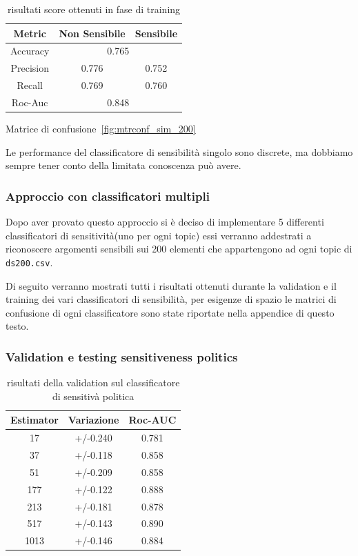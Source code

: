 \begin{table}[h]
\label{tbl:training_sens}
\centering
\begin{tabular}{|c|c|c|}
\hline
\textbf{Metric} & \textbf{Non Sensibile} & \textbf{Sensibile} \\ \hline
Accuracy & \multicolumn{2}{c|}{0.765} \\ \hline
Precision & 0.776 & 0.752 \\ \hline
Recall & 0.769 & 0.760 \\ \hline
Roc-Auc & \multicolumn{2}{c|}{0.848} \\ \hline
\end{tabular}
\caption{risultati score ottenuti in  fase di training}
\end{table}
\FloatBarrier

Matrice di confusione~\ref{fig:mtrconf_sim_200}\newline

Le performance del classificatore di sensibilità singolo sono discrete, ma dobbiamo sempre tener conto della limitata conoscenza può avere.

\subsubsection{Approccio con classificatori multipli}
\label{sssec:multiclass}
Dopo aver provato questo approccio si è deciso di implementare 5 differenti classificatori di sensitività(uno per ogni topic) essi verranno addestrati a riconoscere argomenti sensibili sui 200 elementi che appartengono ad ogni topic di {\tt ds200.csv}.

Di seguito verranno mostrati tutti i risultati ottenuti durante la validation e il training dei vari classificatori di sensibilità, per esigenze di spazio le matrici di confusione di ogni classificatore sono state riportate nella appendice di questo testo.

\subsubsection{Validation e testing sensitiveness politics}
\label{sssec:val_testing_pol}

\begin{table}[h]
\label{tbl:val_sens_pol}
\centering
\begin{tabular}{|c|c|c|}
\hline
\textbf{Estimator} & \textbf{Variazione} & \textbf{Roc-AUC} \\ \hline
17 & +/-0.240 & 0.781 \\ \hline
37 & +/-0.118 & 0.858 \\ \hline
51 & +/-0.209 & 0.858 \\ \hline
177 & +/-0.122 & 0.888 \\ \hline
213 & +/-0.181 & 0.878 \\ \hline
517 & +/-0.143 & 0.890 \\ \hline
1013 & +/-0.146 & 0.884 \\ \hline
\end{tabular}
\caption{risultati della validation sul classificatore di sensitivà politica}
\end{table}
\FloatBarrier

